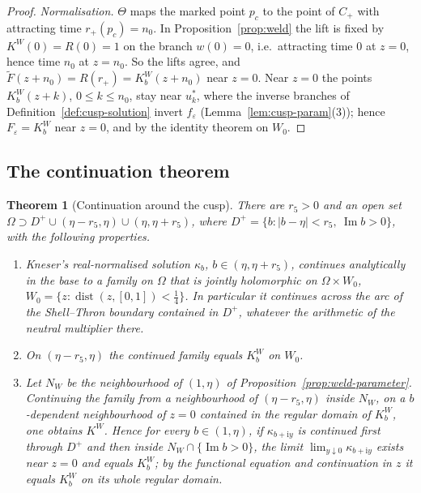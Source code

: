 \documentclass[11pt]{amsart}
\newtheorem{theorem}{Theorem}[section]
\theoremstyle{definition}
\newcommand{\Rr}{R}
\newcommand{\Kk}{K}
\newcommand{\ii}{\mathrm{i}}
\begin{document}
\begin{proof}
\emph{Normalisation.}  $\Theta$ maps the marked point $p_c$ to the point of $C_+$
with attracting time $r_+(p_c)=n_0$.  In Proposition~\ref{prop:weld} the lift is
fixed by $\Kk^W(0)=\Rr(0)=1$ on the branch $w(0)=0$, i.e.\ attracting time $0$
at $z=0$, hence time $n_0$ at $z=n_0$.  So the lifts agree, and
$\tilde F(z+n_0)=\Rr(r_+)=\Kk^W_b(z+n_0)$ near $z=0$.  Near $z=0$ the points
$\Kk^W_b(z+k)$, $0\le k\le n_0$, stay near $u^*_k$, where the inverse branches of
Definition~\ref{def:cusp-solution} invert $f_\varepsilon$ (Lemma~\ref{lem:cusp-param}(3));
hence $F_\varepsilon=\Kk^W_b$ near $z=0$, and by the identity theorem on $W_0$.
\end{proof}

\subsection{The continuation theorem}

\begin{theorem}[Continuation around the cusp]\label{thm:cusp}
There are $r_5>0$ and an open set $\Omega\supset D^+\cup(\eta-r_5,\eta)\cup(\eta,\eta+r_5)$,
where $D^+=\{b:|b-\eta|<r_5,\ \operatorname{Im}b>0\}$, with the following properties.
\begin{enumerate}
\item Kneser's real-normalised solution $\kappa_b$, $b\in(\eta,\eta+r_5)$, continues
  analytically in the base to a family on $\Omega$ that is jointly holomorphic on
  $\Omega\times W_0$, $W_0=\{z:\operatorname{dist}(z,[0,1])<\tfrac14\}$.  In particular it
  continues across the arc of the Shell--Thron boundary contained in $D^+$,
  whatever the arithmetic of the neutral multiplier there.
\item On $(\eta-r_5,\eta)$ the continued family equals $\Kk^W_b$ on $W_0$.
\item Let $N_W$ be the neighbourhood of $(1,\eta)$ of
  Proposition~\ref{prop:weld-parameter}.  Continuing the family from a
  neighbourhood of $(\eta-r_5,\eta)$ inside $N_W$, on a $b$-dependent
  neighbourhood of $z=0$ contained in the regular domain of $\Kk^W_b$, one
  obtains $\Kk^W$.  Hence for every $b\in(1,\eta)$, if $\kappa_{b+\ii y}$ is continued first
  through $D^+$ and then inside $N_W\cap\{\operatorname{Im}b>0\}$, the limit
  $\lim_{y\downarrow0}\kappa_{b+\ii y}$ exists near $z=0$ and equals $\Kk^W_b$; by the
  functional equation and continuation in $z$ it equals $\Kk^W_b$ on its whole
  regular domain.
\end{enumerate}
\end{theorem}
\end{document}
